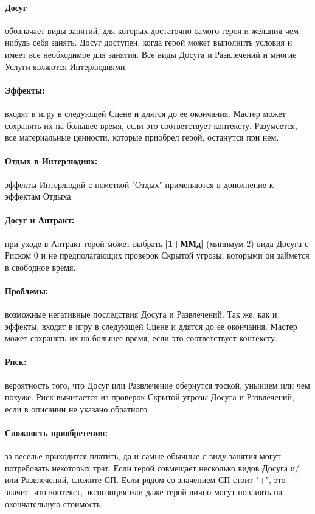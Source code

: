 \paragraph{Досуг} обозначает виды занятий, для которых достаточно самого героя и желания чем-нибудь себя занять. Досуг доступен, когда герой может выполнить условия и имеет все необходимое для занятия.
\newline Все виды Досуга и Развлечений и многие Услуги являются Интерлюдиями.

\paragraph{Эффекты:} входят в игру в следующей Сцене и длятся до ее окончания. Мастер может сохранять их на большее время, если это соответствует контексту. Разумеется, все материальные ценности, которые приобрел герой, останутся при нем.
\paragraph{Отдых в Интерлюдиях:} эффекты Интерлюдий с пометкой "Отдых" применяются в дополнение к эффектам Отдыха.
\paragraph{Досуг и Антракт:} при уходе в Антракт герой может выбрать \textbf{|1+ММд|} (минимум 2) вида Досуга с Риском 0 и не предполагающих проверок Скрытой угрозы, которыми он займется в свободное время.
\paragraph{Проблемы:} возможные негативные последствия Досуга и Развлечений. Так же, как и эффекты, входят в игру в следующей Сцене и длятся до ее окончания. Мастер может сохранять их на большее время, если это соответствует контексту.
\paragraph{Риск:} вероятность того, что Досуг или Развлечение обернутся тоской, унынием или чем похуже. Риск вычитается из проверок Скрытой угрозы Досуга и Развлечений, если в описании не указано обратного.
\paragraph{Сложность приобретения:} за веселье приходится платить, да и самые обычные с виду занятия могут потребовать некоторых трат. Если герой совмещает несколько видов Досуга и/ или Развлечений, сложите СП. 
\newline Если рядом со значением СП стоит "+", это значит, что контекст, экспозиция или даже герой лично могут повлиять на окончательную стоимость.
